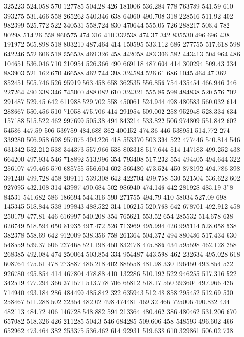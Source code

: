 325223 524.058 570
127785 504.28 426
181006 536.284 778
763789 541.59 610
393275 531.466 558
265262 540.346 638
64060 490.708 318
228516 511.92 402
982399 525.772 522
340531 558.724 830
470644 555.05 726
288217 508.4 782
90298 514.26 558
860575 474.316 410
332538 474.37 342
835530 496.696 438
191972 505.898 518
803210 487.464 414
150595 533.112 686
277755 517.618 598
642246 552.606 518
556538 469.326 458
442058 483.306 582
443413 504.964 486
104651 536.046 710
210954 526.366 490
669118 487.604 414
300294 509.43 334
883903 521.162 670
466588 462.744 398
324584 526.61 686
1045 464.47 362
852451 505.746 526
95919 563.458 658
362535 556.856 754
435454 466.946 346
227264 490.338 346
745000 488.082 610
324321 555.86 598
484838 520.576 702
291487 529.45 642
611988 529.702 558
450061 524.944 498
480583 560.032 614
288667 550.456 510
71058 475.706 414
291954 509.002 258
952948 528.334 634
157188 515.522 462
997699 505.38 494
843214 533.822 506
974809 551.842 602
54586 447.59 506
539759 484.688 362
400152 474.36 446
538951 514.772 274
339280 506.958 698
957076 494.226 418
553370 503.394 522
477446 540.814 546
631342 552.212 538
344373 557.966 538
803318 517.644 514
147183 499.252 438
664200 497.934 546
718892 513.996 354
793408 517.232 554
494405 494.644 322
256107 479.466 570
685755 556.604 602
566480 473.524 450
878192 494.786 398
391240 499.728 458
209111 539.308 642
422704 499.758 530
521504 536.622 602
927095 432.108 314
43987 490.684 502
986940 474.146 442
281928 483.19 378
84531 541.682 586
186694 544.316 590
271755 494.79 410
58034 527.09 698
145345 518.844 538
199843 488.522 314
106215 520.768 642
678701 492.912 458
250179 477.81 446
616997 540.208 354
765621 553.52 654
285532 514.678 638
626749 518.594 650
81935 497.472 526
713969 495.994 426
995114 528.658 538
382378 558.69 642
912009 538.356 758
261364 504.372 494
880486 517.434 630
548559 539.37 506
227468 521.198 450
832478 475.886 434
595598 462.128 258
268385 492.084 474
250064 503.854 334
954487 443.598 462
232634 495.028 618
608764 475.61 478
273887 486.218 402
885558 481.98 330
196450 493.854 522
926780 495.854 414
467804 478.88 410
132286 510.192 522
946255 517.316 522
342519 477.294 366
371571 513.778 706
65812 518.17 550
993604 497.966 426
714940 493.184 286
484499 485.842 322
635943 512.48 858
295452 512.69 530
258467 511.288 502
22354 482.02 498
474481 469.32 466
725006 490.832 434
482113 484.72 406
146728 548.882 594
213364 480.462 386
480462 531.206 670
657082 518.326 426
211285 504.3 546
684285 509.606 458
548593 496.602 466
652962 473.464 382
253375 536.462 614
92931 519.638 610
329861 506.02 738
